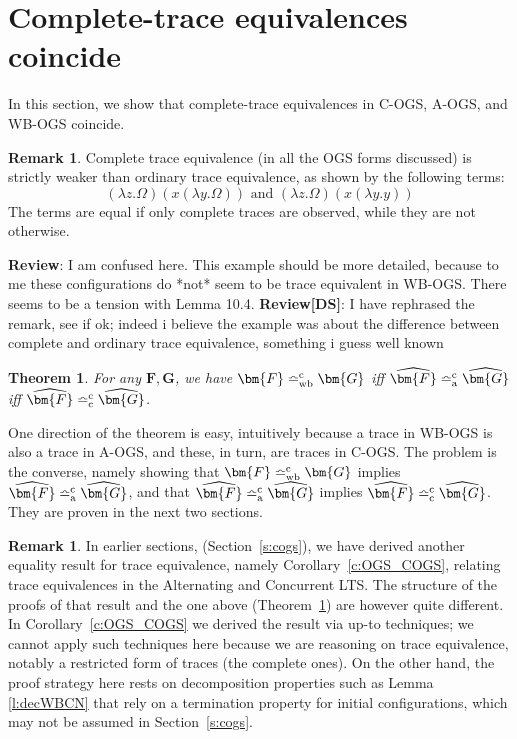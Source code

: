 \documentclass[11pt,a4paper]{amsart}
\theoremstyle{plain}
\theoremstyle{definition}
\theoremstyle{defC}
\theoremstyle{thmC}
\theoremstyle{plain}
\numberwithin{equation}{section}
\newcommand{\AOGS}{\mbox{{\rm A-OGS}}\xspace}      %
\newcommand{\COGS}{\mbox{{\rm C-OGS}}\xspace}      %
\newcommand{\WBOGS}{\mbox{{\rm WB-OGS}}\xspace}      %
\newcommand{\genTEcomp}[1]{\mathrel{\bumpeq^{\rm c}_{\rm{\lowercase{#1}}}}} %
\newcommand{\TEwbc}{\genTEcomp{WB}}       %
\newcommand{\TEc}{\genTEcomp{A}}        %
\newcommand{\TEpc}{\genTEcomp{C}}        %
\newcommand{\FF}{F}
\newcommand{\GG}{G}
\newcommand{\FFb}{{\bm{\FF}}} %
\newcommand{\GGb}{{\bm{\GG}}} %
\newcommand{\es}{\eraseStack}
\newcommand{\eraseStack}[1]{\widehat{#1}}
\theoremstyle{plain}
\newtheorem{theorem}[thm]{Theorem}
\theoremstyle{definition}
\newtheorem{remark}[thm]{Remark}
\newcommand{\reviewComment}[1]{\textbf{Review}: {\color{red} #1}}
\newcommand{\reviewCommentDS}[1]{\textbf{Review[DS]}: {\color{green} #1}}
\newcommand{\reviewComment}[1]{}
\newcommand{\reviewCommentDS}[1]{}
\begin{document}
\section{Complete-trace equivalences coincide }
\label{s:wbc_vs_c}

In this section, we show that complete-trace equivalences 
in \COGS, \AOGS, and \WBOGS  coincide.

\begin{remark}
Complete trace equivalence (in all the OGS forms discussed)  is strictly weaker than
ordinary trace equivalence, as shown by the following terms:
\[
 (\lambda z.\Omega)(x (\lambda y.\Omega)) \text{ and }
 (\lambda z.\Omega)(x (\lambda y.y))
\]
The terms  are equal  if only complete traces are observed, while  they are
not otherwise.
\end{remark}


\reviewComment{
 I am confused here. This example should be more
detailed, because to me these configurations do *not* seem to be trace
equivalent in WB-OGS. There seems to be a tension with Lemma 10.4.
}
\reviewCommentDS{I have rephrased the remark, see if ok; indeed i believe the example was about
the difference between complete and ordinary trace equivalence, something i guess well known}
\begin{theorem}
\label{t:main_2_WBC}
For any $\FFb,\GGb$, 
we have 
$\FFb  \TEwbc \GGb$
iff
$\es\FFb  \TEc \es\GGb$ iff
$\es\FFb  \TEpc \es\GGb$.
\end{theorem} 
\noindent
One direction of the theorem is easy, intuitively because a trace in 
 \WBOGS is 
also a trace in \AOGS, and these, in turn,  are traces in 
 \COGS.
The problem is the converse, namely showing 
that  
$\FFb  \TEwbc \GGb$
implies
$\es\FFb  \TEc \es\GGb$, and 
that 
$\es\FFb  \TEc \es\GGb$ 
implies $\es\FFb  \TEpc \es\GGb$.
They are proven in the next two sections.

\begin{remark}
\label{r:CT_COGS}
In earlier sections, (Section~\ref{s:cogs}),
we have  derived another equality result for
trace equivalence, namely Corollary~\ref{c:OGS_COGS}, 
relating  trace equivalences in the Alternating 
and Concurrent LTS. 
The structure of the proofs of that result and the one above 
(Theorem~\ref{t:main_2_WBC})
 are however quite different. 
In  Corollary~\ref{c:OGS_COGS} we derived the result via up-to techniques; 
we cannot apply such techniques here because we are reasoning on trace equivalence,
notably a restricted form of traces (the complete ones). 
On the other hand,  the proof strategy here 
rests on decomposition properties 
such as  Lemma \ref{l:decWBCN} that rely on a termination property for initial
configurations, which may not be assumed in 
Section~\ref{s:cogs}.
\end{remark} 
\end{document}
